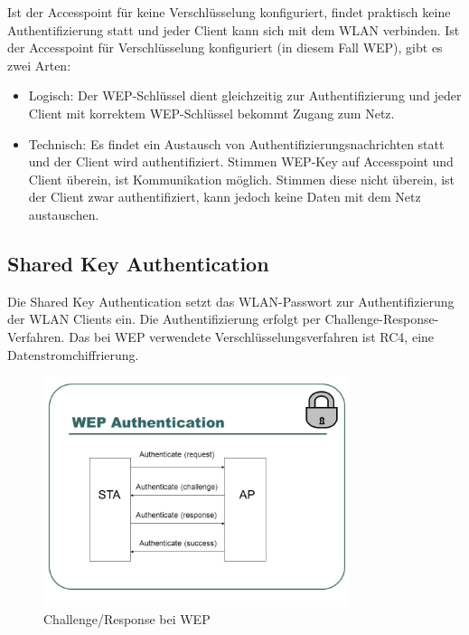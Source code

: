 	Ist der Accesspoint für keine Verschlüsselung konfiguriert, findet praktisch keine Authentifizierung statt und jeder Client kann sich mit dem WLAN verbinden.
	Ist der Accesspoint für Verschlüsselung konfiguriert (in diesem Fall WEP), gibt es zwei Arten: \\
	\begin{itemize}
	\item Logisch: Der WEP-Schlüssel dient gleichzeitig zur Authentifizierung und jeder Client mit korrektem WEP-Schlüssel bekommt Zugang zum Netz.

	\item Technisch: Es findet ein Austausch von Authentifizierungsnachrichten statt und der Client wird authentifiziert. Stimmen WEP-Key auf Accesspoint und Client überein, ist Kommunikation möglich. Stimmen diese nicht überein, ist der Client zwar authentifiziert, kann jedoch keine Daten mit dem Netz austauschen. \\
	\end{itemize}

	\subsection{Shared Key Authentication}
	Die Shared Key Authentication setzt das WLAN-Passwort zur Authentifizierung der WLAN Clients ein. Die Authentifizierung erfolgt per Challenge-Response-Verfahren. Das bei WEP verwendete Verschlüsselungsverfahren ist RC4, eine Datenstromchiffrierung. \\
		\begin{figure}[H]
			\centering
			\includegraphics[width=0.8\textwidth]{images/WLAN/WEPchres.jpg}
			\caption{Challenge/Response bei WEP}
			\label{fig:Challenge/Response bei WEP}
		\end{figure}
		
